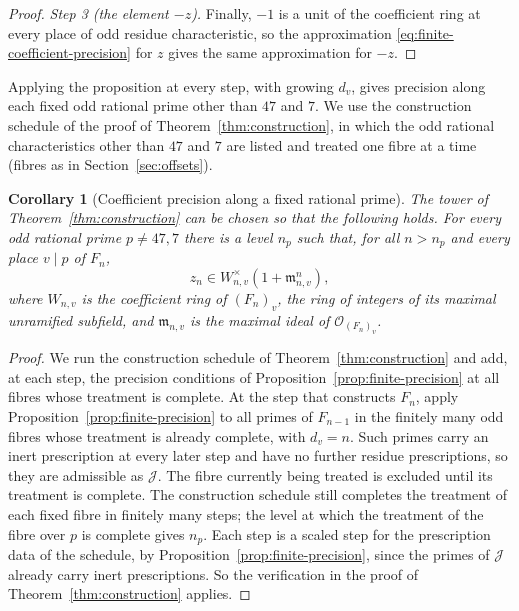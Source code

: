 \documentclass[11pt]{article}
\theoremstyle{plain}
\newtheorem{corollary}[theorem]{Corollary}
\theoremstyle{definition}
\theoremstyle{remark}
\newcommand{\OO}{\mathcal O}
\begin{document}
\begin{proof}
\emph{Step 3 (the element $-z$).}  Finally, $-1$ is a unit of the
coefficient ring at every place of odd residue characteristic, so the
approximation \eqref{eq:finite-coefficient-precision} for $z$ gives the
same approximation for $-z$.
\end{proof}

Applying the proposition at every step, with growing $d_v$, gives
precision along each fixed odd rational prime other than $47$ and $7$.  We use the construction
schedule of the proof of Theorem~\ref{thm:construction}, in which the
odd rational characteristics other than $47$ and $7$ are listed and
treated one fibre at a time (fibres as in Section~\ref{sec:offsets}).

\begin{corollary}[Coefficient precision along a fixed rational prime]\label{cor:fixed-precision}
The tower of Theorem~\ref{thm:construction} can be chosen so that the
following holds.  For every odd rational prime $p\ne47,7$ there is a
level $n_p$ such that, for all $n>n_p$ and every place $v\mid p$ of
$F_n$,
\[
 z_n\in W_{n,v}^\times(1+\mathfrak m_{n,v}^{n}),
\]
where $W_{n,v}$ is the coefficient ring of $(F_n)_v$, the ring of
integers of its maximal unramified subfield, and $\mathfrak m_{n,v}$ is
the maximal ideal of $\OO_{(F_n)_v}$.
\end{corollary}

\begin{proof}
We run the construction schedule of Theorem~\ref{thm:construction} and
add, at each step, the precision conditions of
Proposition~\ref{prop:finite-precision} at all fibres whose treatment is
complete.  At the step that constructs $F_n$, apply
Proposition~\ref{prop:finite-precision} to all primes of $F_{n-1}$ in
the finitely many odd fibres whose treatment is already complete, with
$d_v=n$.  Such primes carry an inert prescription at every later step
and have no further residue prescriptions, so they are admissible as
$\mathcal J$.  The fibre currently being treated is excluded until its
treatment is complete.  The construction schedule still completes the
treatment of each fixed fibre in finitely many steps; the level at which
the treatment of the fibre over $p$ is complete gives $n_p$.  Each step
is a scaled step for the prescription data of the schedule, by
Proposition~\ref{prop:finite-precision}, since the primes of $\mathcal
J$ already carry inert prescriptions.  So the verification in the proof
of Theorem~\ref{thm:construction} applies.
\end{proof}
\end{document}
